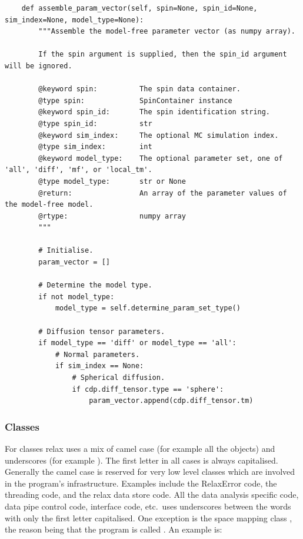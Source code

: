 \begin{lstlisting}
    def assemble_param_vector(self, spin=None, spin_id=None, sim_index=None, model_type=None):
        """Assemble the model-free parameter vector (as numpy array).

        If the spin argument is supplied, then the spin_id argument will be ignored.

        @keyword spin:          The spin data container.
        @type spin:             SpinContainer instance
        @keyword spin_id:       The spin identification string.
        @type spin_id:          str
        @keyword sim_index:     The optional MC simulation index.
        @type sim_index:        int
        @keyword model_type:    The optional parameter set, one of 'all', 'diff', 'mf', or 'local_tm'. 
        @type model_type:       str or None
        @return:                An array of the parameter values of the model-free model.
        @rtype:                 numpy array
        """

        # Initialise.
        param_vector = []

        # Determine the model type.
        if not model_type:
            model_type = self.determine_param_set_type()

        # Diffusion tensor parameters.
        if model_type == 'diff' or model_type == 'all':
            # Normal parameters.
            if sim_index == None:
                # Spherical diffusion.
                if cdp.diff_tensor.type == 'sphere':
                    param_vector.append(cdp.diff_tensor.tm)
\end{lstlisting}



\subsubsection{Classes}

For classes relax uses a mix of camel case (for example all the  objects) and underscores (for example ).
The first letter in all cases is always capitalised.
Generally the camel case is reserved for very low level classes which are involved in the program's infrastructure.
Examples include the RelaxError code, the threading code, and the relax data store code.
All the data analysis specific code, data pipe control code, interface code, etc.\ uses underscores between the words with only the first letter capitalised.
One exception is the space mapping class , the reason being that the program is called .
An example is:

